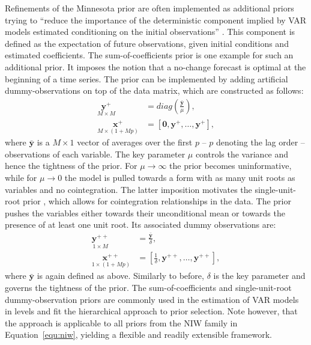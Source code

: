 \documentclass[article,nojss]{jss} %
\begin{document}
Refinements of the Minnesota prior are often implemented as additional priors trying to ``reduce the importance of the deterministic component implied by VAR models estimated conditioning on the initial observations'' \citep[p.~440]{giannone2015}. This component is defined as the expectation of future observations, given initial conditions and estimated coefficients.
The sum-of-coefficients prior \citep{doan1984} is one example for such an additional prior. It imposes the notion that a no-change forecast is optimal at the beginning of a time series. The prior can be implemented by adding artificial dummy-observations on top of the data matrix, which are constructed as follows:
\begin{align}
    \underset{M \times M}{\boldsymbol{y^+}} &= diag \left(\frac{\boldsymbol{\bar{y}}}{\mu}\right), \nonumber \\
    \underset{M \times (1 + Mp)}{\boldsymbol{x^+}} &= [\boldsymbol{0}, \boldsymbol{y^+}, \dots, \boldsymbol{y^+}], \nonumber
\end{align}
where $\boldsymbol{\bar{y}}$ is a $M \times 1$ vector of averages over the first $p$ -- $p$  denoting the lag order -- observations of each variable.
The key parameter $\mu$ controls the variance and hence the tightness of the prior. For $\mu \to \infty$ the prior becomes uninformative, while for $\mu \to 0$ the model is pulled towards a form with as many unit roots as variables and no cointegration.
The latter imposition motivates the single-unit-root prior \citep{sims1993, sims1998}, which allows for cointegration relationships in the data. The prior pushes the variables either towards their unconditional mean or towards the presence of at least one unit root. Its associated dummy observations are:
\begin{align}
    \underset{1 \times M}{\boldsymbol{y^{++}}} &= \frac{\boldsymbol{\bar{y}}}{\delta}, \nonumber \\
    \underset{1 \times (1 + Mp)}{\boldsymbol{x^{++}}} &= \left[\frac{1}{\delta}, \boldsymbol{y^{++}}, \dots, \boldsymbol{y^{++}}\right], \nonumber
\end{align}
where $\boldsymbol{\bar{y}}$ is again defined as above. Similarly to before, $\delta$ is the key parameter and governs the tightness of the prior.
The sum-of-coefficients and single-unit-root dummy-observation priors are commonly used in the estimation of VAR models in levels and fit the hierarchical approach to prior selection. Note however, that the approach is applicable to all priors from the NIW family in Equation~\ref{equ:niw}, yielding a flexible and readily extensible framework.
\end{document}
